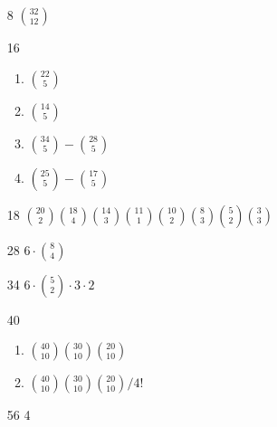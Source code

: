 \documentclass{article}
\begin{document}
\begin{enumerate}
  \item[8] ${32 \choose 12}$
  \item[16]
    \begin{enumerate}
      \item ${22 \choose 5}$
      \item ${14 \choose 5}$
      \item ${34 \choose 5} - {28 \choose 5}$
      \item ${25 \choose 5} - {17 \choose 5}$
    \end{enumerate}
  \item[18] ${20 \choose 2}{18 \choose 4}{14 \choose 3}{11 \choose 1}
             {10 \choose 2}{8  \choose 3}{5  \choose 2}{3  \choose 3}$
  \item[28] $6 \cdot {8 \choose 4}$
  \item[34] $6 \cdot {5 \choose 2} \cdot 3 \cdot 2$
  \item[40] 
    \begin{enumerate}
      \item ${40 \choose 10}{30 \choose 10}{20 \choose 10}$
      \item ${40 \choose 10}{30 \choose 10}{20 \choose 10}/4!$
    \end{enumerate} 
  \item[56] 4
\end{enumerate}
\end{document}
